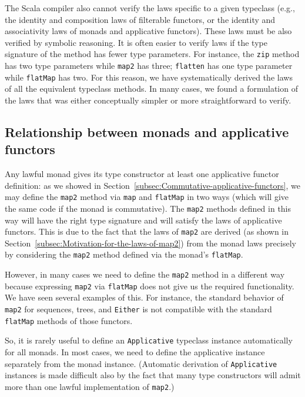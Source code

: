 The Scala compiler also cannot verify the laws specific to a given
typeclass (e.g., the identity and composition laws of filterable functors,
or the identity and associativity laws of monads and applicative functors).
These laws must be also verified by symbolic reasoning. It is often
easier to verify laws if the type signature of the method has fewer
type parameters. For instance, the \lstinline!zip! method has two
type parameters while \lstinline!map2! has three; \lstinline!flatten!
has one type parameter while \lstinline!flatMap! has two. For this
reason, we have systematically derived the laws of all the equivalent
typeclass methods. In many cases, we found a formulation of the laws
that was either conceptually simpler or more straightforward to verify. 

\subsection{Relationship between monads and applicative functors}

Any lawful monad gives its type constructor at least one applicative
functor definition: as we showed in Section~\ref{subsec:Commutative-applicative-functors},
we may define the \lstinline!map2! method via \lstinline!map! and
\lstinline!flatMap! in two ways (which will give the same code if
the monad is commutative). The \lstinline!map2! methods defined in
this way will have the right type signature and will satisfy the laws
of applicative functors. This is due to the fact that the laws of
\lstinline!map2! are derived (as shown in Section~\ref{subsec:Motivation-for-the-laws-of-map2})
from the monad laws precisely by considering the \lstinline!map2!
method defined via the monad\textsf{'}s \lstinline!flatMap!.

However, in many cases we need to define the \lstinline!map2! method
in a different way because expressing \lstinline!map2! via \lstinline!flatMap!
does not give us the required functionality. We have seen several
examples of this. For instance, the standard behavior of \lstinline!map2!
for sequences, trees, and \lstinline!Either! is not compatible with
the standard \lstinline!flatMap! methods of those functors.

So, it is rarely useful to define an \lstinline!Applicative! typeclass
instance automatically for all monads. In most cases, we need to define
the applicative instance separately from the monad instance. (Automatic
derivation of \lstinline!Applicative! instances is made difficult
also by the fact that many type constructors will admit more than
one lawful implementation of \lstinline!map2!.)

